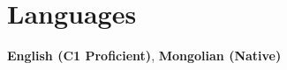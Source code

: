 \documentclass[letterpaper,11pt]{article}
\begin{document}
\section{Languages}
  \begin{itemize}[leftmargin=0.15in, label={}]
    \small{\item{
     \textbf{English (C1 Proficient)}, \textbf{Mongolian (Native)}
    }}
  \end{itemize}
\end{document}
